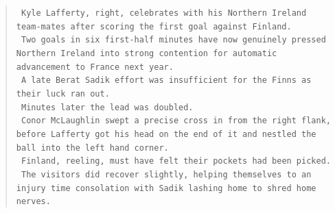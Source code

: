 \documentclass[a4paper, 12pt]{article}
\begin{document}
\begin{quotation}
\texttt{
Kyle Lafferty,  right,  celebrates with his Northern Ireland team-mates after scoring the first goal against Finland.
}\\

\texttt{
 Two goals in six first-half minutes have now genuinely pressed Northern Ireland into strong contention for automatic advancement to France next year. 
}\\

\texttt{
 A late Berat Sadik effort was insufficient for the Finns as their luck ran out. 
}\\

\texttt{
 Minutes later the lead was doubled. 
}\\

\texttt{
 Conor McLaughlin swept a precise cross in from the right flank,  before Lafferty got his head on the end of it and nestled the ball into the left hand corner. 
}\\

\texttt{
 Finland,  reeling,  must have felt their pockets had been picked. 
}\\

\texttt{
 The visitors did recover slightly,  helping themselves to an injury time consolation with Sadik lashing home to shred home nerves.}\\
\end{quotation}


\newpage
\printindex
\end{document}
